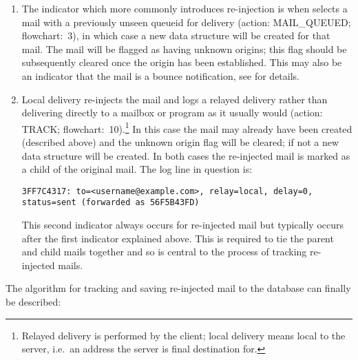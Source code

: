 \begin{enumerate}

    \item The indicator which more commonly introduces re-injection is when
         selects a mail with a previously unseen queueid for
        delivery (action: MAIL\_QUEUED\@; flowchart:~3), in which case a
        new data structure will be created for that mail.  The mail will be
        flagged as having unknown origins; this flag should be subsequently
        cleared once the origin has been established.  This may also be an
        indicator that the mail is a bounce notification, see
         for details.

    \item Local delivery re-injects the mail and logs a relayed delivery
        rather than delivering directly to a mailbox or program as it
        usually would (action: TRACK\@; flowchart:~10).\footnote{Relayed
        delivery is performed by the \SMTP{} client; local delivery means
        local to the server, i.e.\ an address the server is final
        destination for.} In this case the mail may already have been
        created (described above) and the unknown origin flag will be
        cleared; if not a new data structure will be created.  In both
        cases the re-injected mail is marked as a child of the original
        mail.  The log line in question is:

        \texttt{3FF7C4317: to=<username@example.com>, relay=local, \newline
        delay=0, status=sent (forwarded as 56F5B43FD)}

        This second indicator always occurs for re-injected mail but
        typically occurs after the first indicator explained above.  This
        is required to tie the parent and child mails together and so is
        central to the process of tracking re-injected mails.

\end{enumerate}

The algorithm for tracking and saving re-injected mail to the database can
finally be described:

